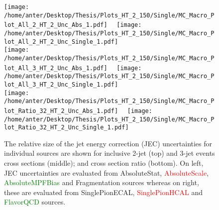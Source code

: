 \begin{figure}[!hbtp]
\hspace*{-5mm}\texttt{[image: /home/anter/Desktop/Thesis/Plots\_HT\_2\_150/Single/MC\_Macro\_Plot\_All\_2\_HT\_2\_Unc\_Abs\_1.pdf]}%
~~\texttt{[image: /home/anter/Desktop/Thesis/Plots\_HT\_2\_150/Single/MC\_Macro\_Plot\_All\_2\_HT\_2\_Unc\_Single\_1.pdf]}\\
\hspace*{-5mm}\texttt{[image: /home/anter/Desktop/Thesis/Plots\_HT\_2\_150/Single/MC\_Macro\_Plot\_All\_3\_HT\_2\_Unc\_Abs\_1.pdf]}%
~~\texttt{[image: /home/anter/Desktop/Thesis/Plots\_HT\_2\_150/Single/MC\_Macro\_Plot\_All\_3\_HT\_2\_Unc\_Single\_1.pdf]}\\
\hspace*{-5mm}\texttt{[image: /home/anter/Desktop/Thesis/Plots\_HT\_2\_150/Single/MC\_Macro\_Plot\_Ratio\_32\_HT\_2\_Unc\_Abs\_1.pdf]}%
~~\texttt{[image: /home/anter/Desktop/Thesis/Plots\_HT\_2\_150/Single/MC\_Macro\_Plot\_Ratio\_32\_HT\_2\_Unc\_Single\_1.pdf]}
\caption{The relative size of the jet energy correction (JEC) uncertainties for individual sources are shown for inclusive 2-jet (top) and 3-jet events cross sections (middle); and cross section ratio \ratio (bottom). On left, JEC uncertainties are evaluated from \textcolor{blue2}{AbsoluteStat}, \textcolor{red}{AbsoluteScale}, \textcolor{green}{AbsoluteMPFBias} and \textcolor{pink2}{Fragmentation} sources whereas on right, these are evaluated from \textcolor{blue2}{SinglePionECAL}, \textcolor{red}{SinglePionHCAL} and \textcolor{green}{FlavorQCD} sources.}
\label{fig:jes1}
\end{figure}

